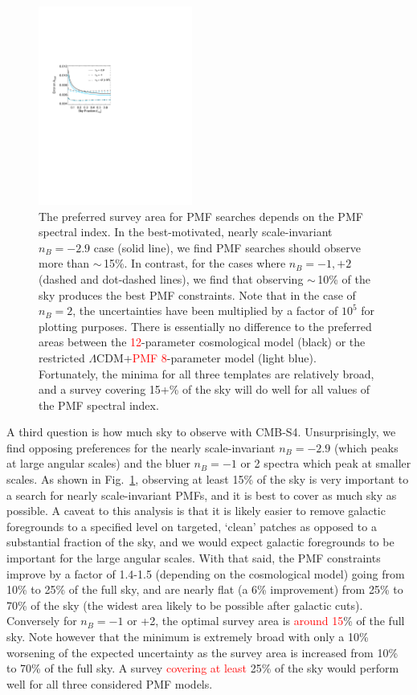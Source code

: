 \documentclass[apj]{emulateapj}
\newcommand{\lcdm}{\ensuremath{\Lambda}CDM}
\newcommand{\changed}[1]{\textcolor{Red}{#1}}
\begin{document}
\begin{figure}[htb]\centering
\includegraphics[width=0.45\textwidth,clip,trim={2.cm 12.5cm 11cm 7.5cm}]{pmf_area.pdf}
  \caption[Area dependence]{
  The preferred survey area for PMF searches depends on the PMF spectral index. 
    In the best-motivated, nearly scale-invariant $n_B = -2.9$ case (solid line), we find PMF searches should observe more than $\sim$\,15\%. 
 In contrast, for the cases where $n_B = -1, +2$ (dashed and dot-dashed lines), we find that observing  $\sim$\,10\% of the sky produces the best PMF constraints. 
   Note that in the case of $n_B=2$, the uncertainties have been multiplied by a factor of $10^5$ for plotting purposes. 
   There is essentially no difference to the preferred areas between the \changed{12}-parameter cosmological model (black) or the restricted \lcdm{}+\changed{PMF 8}-parameter model (light blue). 
     Fortunately, the minima for all three templates are relatively broad, and a survey covering 15+\% of the sky will do well for all values of the PMF spectral index. 
    \label{fig:area}
  }
\end{figure}


A third question is how much sky to observe with CMB-S4. 
Unsurprisingly, we find opposing preferences for the nearly scale-invariant $n_B=-2.9$ (which peaks at large angular scales) and the bluer $n_B=-1$ or 2 spectra which peak at smaller scales. 
As shown in  Fig.~\ref{fig:area}, observing at least 15\% of the sky is very important to a search for nearly scale-invariant PMFs, and it is best  to cover as much sky as possible. 
A caveat to this analysis is that it is likely easier to remove galactic foregrounds to a specified level on targeted, `clean' patches as opposed to a substantial fraction of the sky, and we would expect galactic foregrounds to be important for the large angular scales. 
With that said, the PMF constraints improve by a factor of 1.4-1.5 (depending on the cosmological model) going from 10\% to 25\% of the full sky, and are nearly flat (a 6\% improvement) from 25\% to 70\% of the sky (the widest area likely to be possible after galactic cuts).
Conversely for $n_B=-1$ or +2, the optimal survey area is \changed{around 15}\% of the full sky. 
Note however that the minimum is extremely broad with only a 10\% worsening of the expected uncertainty as the survey area is increased from 10\% to 70\% of the  full sky. 
A survey \changed{ covering at least} 25\% of the sky would perform well for all three considered PMF models. 
\end{document}
